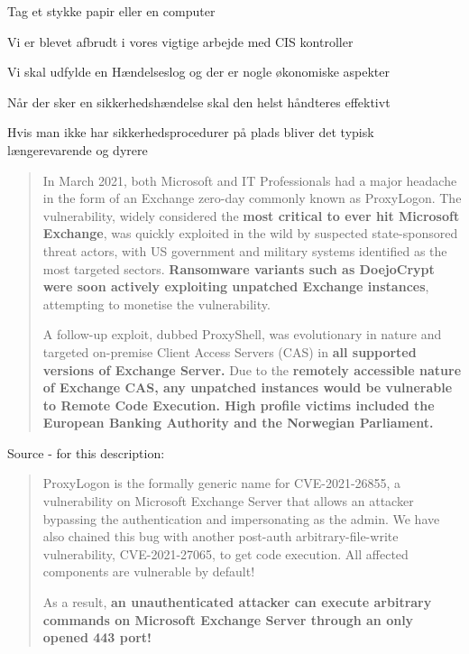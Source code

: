 \documentclass[Screen16to9,17pt]{foils}
\begin{document}
%



Tag et stykke papir eller en computer
\begin{list2}
\item Vi er blevet afbrudt i vores vigtige arbejde med CIS kontroller
\item Vi skal udfylde en Hændelseslog og der er nogle økonomiske aspekter
\item Når der sker en sikkerhedshændelse skal den helst håndteres effektivt
\item Hvis man ikke har sikkerhedsprocedurer på plads bliver det typisk længerevarende og dyrere
\end{list2}

\begin{quote}
In March 2021, both Microsoft and IT Professionals had a major headache in the form of an Exchange zero-day commonly known as ProxyLogon. The vulnerability, widely considered the {\bf most critical to ever hit Microsoft Exchange}, was quickly exploited in the wild by suspected state-sponsored threat actors, with US government and military systems identified as the most targeted sectors. {\bf Ransomware variants such as DoejoCrypt were soon actively exploiting unpatched Exchange instances}, attempting to monetise the vulnerability.

A follow-up exploit, dubbed ProxyShell, was evolutionary in nature and targeted on-premise Client Access Servers (CAS) in {\bf all supported versions of Exchange Server.} Due to the {\bf remotely accessible nature of Exchange CAS, any unpatched instances would be vulnerable to Remote Code Execution. High profile victims included the European Banking Authority and the Norwegian Parliament.}
\end{quote}
Source - for this description:\\



\begin{quote}
ProxyLogon is the formally generic name for CVE-2021-26855, a vulnerability on Microsoft Exchange Server that allows an attacker bypassing the authentication and impersonating as the admin. We have also chained this bug with another post-auth arbitrary-file-write vulnerability, CVE-2021-27065, to get code execution. All affected components are vulnerable by default!

As a result, {\bf an unauthenticated attacker can execute arbitrary commands on Microsoft Exchange Server through an only opened 443 port!}
\end{quote}
\end{document}
